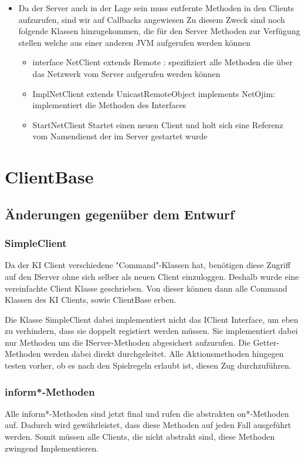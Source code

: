 \documentclass[a4paper,10pt]{article}
\begin{document}
\begin{itemize}
\item Da der Server auch in der Lage sein muss entfernte Methoden in den Clients aufzurufen, sind wir auf Callbacks angewiesen Zu diesem Zweck sind noch folgende Klassen hinzugekommen, die für den Server Methoden zur Verfügung stellen welche aus einer anderen JVM aufgerufen werden können
\begin{itemize}
\item interface NetClient extends Remote : spezifiziert alle Methoden die über das Netzwerk vom Server aufgerufen werden können 
\item ImplNetClient extends UnicastRemoteObject implements NetOjim: implementiert die Methoden des Interfaces
\item StartNetClient Startet einen neuen Client und holt sich eine Referenz vom Namendienst der im Server gestartet wurde
\end{itemize}
\end{itemize}
\newpage
\section{ClientBase}
\subsection {Änderungen gegenüber dem Entwurf}
\subsubsection{SimpleClient}
Da der KI Client verschiedene "Command"-Klassen hat, benötigen diese Zugriff auf den IServer ohne sich selber als neuen Client einzuloggen. Deshalb wurde eine vereinfachte Client Klasse geschrieben. Von dieser können dann alle Command Klassen des KI Clients, sowie ClientBase erben.

Die Klasse SimpleClient dabei implementiert nicht das IClient Interface, um eben zu verhindern, dass sie doppelt registiert werden müssen. Sie implementiert dabei nur Methoden um die IServer-Methoden abgesichert aufzurufen. Die Getter-Methoden werden dabei direkt durchgeleitet. Alle Aktionsmethoden hingegen testen vorher, ob es nach den Spielregeln erlaubt ist, diesen Zug durchzuführen.
\subsubsection{inform*-Methoden}
Alle inform*-Methoden sind jetzt final und rufen die abstrakten on*-Methoden auf. Dadurch wird gewährleistet, dass diese Methoden auf jeden Fall ausgeführt werden. Somit müssen alle Clients, die nicht abstrakt sind, diese Methoden zwingend Implementieren.
\end{document}
